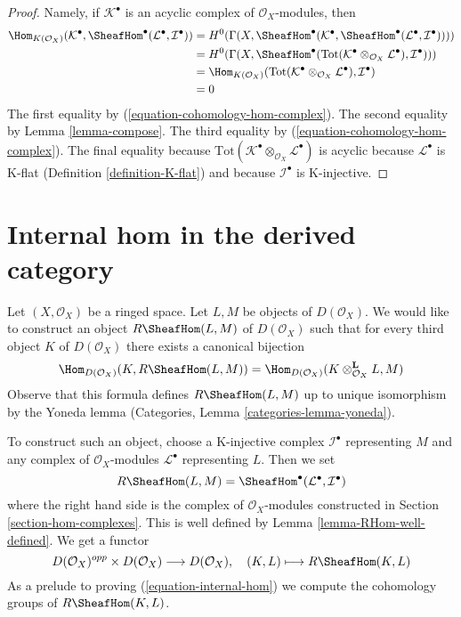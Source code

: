 \begin{proof}
Namely, if $\mathcal{K}^\bullet$ is an acyclic complex of
$\mathcal{O}_X$-modules, then
\begin{align*}
\Hom_{K(\mathcal{O}_X)}(\mathcal{K}^\bullet,
\SheafHom^\bullet(\mathcal{L}^\bullet, \mathcal{I}^\bullet))
& =
H^0(\Gamma(X,
\SheafHom^\bullet(\mathcal{K}^\bullet,
\SheafHom^\bullet(\mathcal{L}^\bullet, \mathcal{I}^\bullet)))) \\
& =
H^0(\Gamma(X, \SheafHom^\bullet(\text{Tot}(
\mathcal{K}^\bullet \otimes_{\mathcal{O}_X} \mathcal{L}^\bullet),
\mathcal{I}^\bullet))) \\
& =
\Hom_{K(\mathcal{O}_X)}(
\text{Tot}(\mathcal{K}^\bullet \otimes_{\mathcal{O}_X} \mathcal{L}^\bullet),
\mathcal{I}^\bullet) \\
& =
0
\end{align*}
The first equality by (\ref{equation-cohomology-hom-complex}).
The second equality by Lemma \ref{lemma-compose}.
The third equality by (\ref{equation-cohomology-hom-complex}).
The final equality because
$\text{Tot}(\mathcal{K}^\bullet \otimes_{\mathcal{O}_X} \mathcal{L}^\bullet)$
is acyclic because $\mathcal{L}^\bullet$ is K-flat
(Definition \ref{definition-K-flat}) and because $\mathcal{I}^\bullet$
is K-injective.
\end{proof}








\section{Internal hom in the derived category}
\label{section-internal-hom}

\noindent
Let $(X, \mathcal{O}_X)$ be a ringed space. Let $L, M$ be objects
of $D(\mathcal{O}_X)$. We would like to construct an object
$R\SheafHom(L, M)$ of $D(\mathcal{O}_X)$ such that for every third
object $K$ of $D(\mathcal{O}_X)$ there exists a canonical bijection
\begin{equation}
\label{equation-internal-hom}
\Hom_{D(\mathcal{O}_X)}(K, R\SheafHom(L, M))
=
\Hom_{D(\mathcal{O}_X)}(K \otimes_{\mathcal{O}_X}^\mathbf{L} L, M)
\end{equation}
Observe that this formula defines $R\SheafHom(L, M)$ up to unique
isomorphism by the Yoneda lemma
(Categories, Lemma \ref{categories-lemma-yoneda}).

\medskip\noindent
To construct such an object, choose a K-injective complex
$\mathcal{I}^\bullet$ representing $M$ and any complex of
$\mathcal{O}_X$-modules $\mathcal{L}^\bullet$ representing $L$.
Then we set
$$
R\SheafHom(L, M) = \SheafHom^\bullet(\mathcal{L}^\bullet, \mathcal{I}^\bullet)
$$
where the right hand side is the complex of $\mathcal{O}_X$-modules
constructed in Section \ref{section-hom-complexes}.
This is well defined by Lemma \ref{lemma-RHom-well-defined}.
We get a functor
$$
D(\mathcal{O}_X)^{opp} \times D(\mathcal{O}_X) \longrightarrow D(\mathcal{O}_X),
\quad
(K, L) \longmapsto R\SheafHom(K, L)
$$
As a prelude to proving (\ref{equation-internal-hom})
we compute the cohomology groups of $R\SheafHom(K, L)$.

